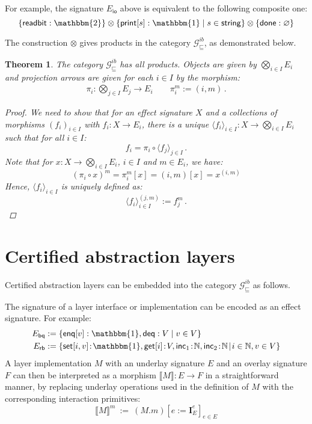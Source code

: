 \documentclass[draft,11pt]{report}
\newtheorem{theorem}{Theorem}
\newcommand{\gcat}{\mathcal{G}_{\sqsubseteq}}
\newcommand{\kw}[1]{\ensuremath{ \mathsf{#1} }}
\begin{document}
For example,
the signature $E_\kw{io}$ above is equivalent
to the following composite one:
\[
    \{ \kw{readbit} : \mathbbm{2} \} \otimes
    \{ \kw{print}[s] : \mathbbm{1} \mid s \in \kw{string} \} \otimes
    \{ \kw{done} : \varnothing \}
\]

The construction $\otimes$ gives products in the category $\gcat^{ib}$,
as demonstrated below.

\begin{theorem}
The category $\gcat^{ib}$ has all products.
Objects are given by $\bigotimes_{i \in I} E_i$
and projection arrows are
given for each $i \in I$ by
the morphism:
\begin{gather*}
    \pi_i : \bigotimes_{j \in I} E_j \rightarrow E_i \qquad
    \pi_i^m := (i, m) \,.
\end{gather*}
\begin{proof}
We need to show that for an effect signature $X$
and a collections of morphisms $(f_i)_{i \in I}$ with
$f_i : X \rightarrow E_i$,
there is a unique
$\langle f_i \rangle_{i \in I} : X \rightarrow \bigotimes_{i \in I} E_i$
such that for all $i \in I$:
\[
    f_i = \pi_i \circ \langle f_j \rangle_{j \in I} \,.
\]
Note that for $x : X \rightarrow \bigotimes_{i \in I} E_i$,
$i \in I$ and $m \in E_i$, we have:
\[
    (\pi_i \circ x)^m = \pi_i^m[x] = (i, m) [x] = x^{(i, m)}
\]
Hence, $\langle f_i \rangle_{i \in I}$ is uniquely defined as:
\[
    \langle f_i \rangle_{i \in I}^{(j, m)} := f_j^m \,.
\]
\end{proof}
\end{theorem}


\section{Certified abstraction layers} \label{sec:intspec:cal} %

Certified abstraction layers can be embedded into
the category $\gcat^{ib}$ as follows.


The signature of a layer interface or implementation
can be encoded as an effect signature.
For example:
\begin{align*}
  E_\kw{bq} &:= \{
    \kw{enq}[v] : \mathbbm{1}, \kw{deq} : V \mid
    v \in V \} \\
  E_\kw{rb} &:= \{
    \kw{set}[i, v] \! : \! \mathbbm{1},
    \kw{get}[i] \! : \! V,
    \kw{inc}_1 \! : \! \mathbb{N},
    \kw{inc}_2 \! : \! \mathbb{N} \! \mid \!
    i \in \mathbb{N}, v \in V \}
\end{align*}
A layer implementation $M$ with
an underlay signature $E$ and
an overlay signature $F$
can then be interpreted as a morphism
$\llbracket M \rrbracket : E \rightarrow F$
in a straightforward manner,
by replacing underlay operations
used in the definition of $M$
with the corresponding interaction primitives:
\[
  \llbracket M \rrbracket^m \: := \: (M.m)[e := \mathbf{I}_E^e]_{e \in E}
\]
\end{document}
